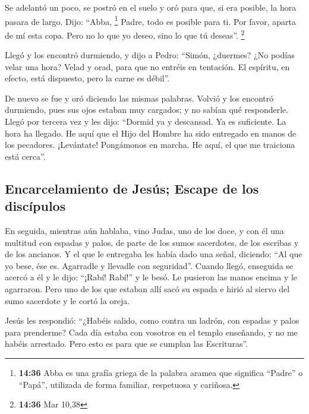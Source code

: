  Se adelantó un poco, se postró en el suelo y oró para
que, si era posible, la hora pasara de largo.  Dijo:
``Abba, \footnote{\textbf{14:36} Abba es una grafía griega de la palabra
  aramea que significa ``Padre'' o ``Papá'', utilizada de forma
  familiar, respetuosa y cariñosa.} Padre, todo es posible para ti. Por
favor, aparta de mí esta copa. Pero no lo que yo deseo, sino lo que tú
deseas''. \footnote{\textbf{14:36} Mar 10,38}

 Llegó y los encontró durmiendo, y dijo a Pedro: ``Simón,
¿duermes? ¿No podías velar una hora?  Velad y orad, para
que no entréis en tentación. El espíritu, en efecto, está dispuesto,
pero la carne es débil''.

 De nuevo se fue y oró diciendo las mismas palabras.
 Volvió y los encontró durmiendo, pues sus ojos estaban
muy cargados; y no sabían qué responderle.  Llegó por
tercera vez y les dijo: ``Dormid ya y descansad. Ya es suficiente. La
hora ha llegado. He aquí que el Hijo del Hombre ha sido entregado en
manos de los pecadores.  ¡Levántate! Pongámonos en
marcha. He aquí, el que me traiciona está cerca''.

\hypertarget{encarcelamiento-de-jesuxfas-escape-de-los-discuxedpulos}{%
\subsection{Encarcelamiento de Jesús; Escape de los
discípulos}\label{encarcelamiento-de-jesuxfas-escape-de-los-discuxedpulos}}

 En seguida, mientras aún hablaba, vino Judas, uno de los
doce, y con él una multitud con espadas y palos, de parte de los sumos
sacerdotes, de los escribas y de los ancianos.  Y el que
le entregaba les había dado una señal, diciendo: ``Al que yo bese, ése
es. Agarradle y llevadle con seguridad''.  Cuando llegó,
enseguida se acercó a él y le dijo: ``¡Rabí! Rabí!'' y le besó.
 Le pusieron las manos encima y le agarraron.
 Pero uno de los que estaban allí sacó su espada e hirió
al siervo del sumo sacerdote y le cortó la oreja.

 Jesús les respondió: ``¿Habéis salido, como contra un
ladrón, con espadas y palos para prenderme?  Cada día
estaba con vosotros en el templo enseñando, y no me habéis arrestado.
Pero esto es para que se cumplan las Escrituras''.

